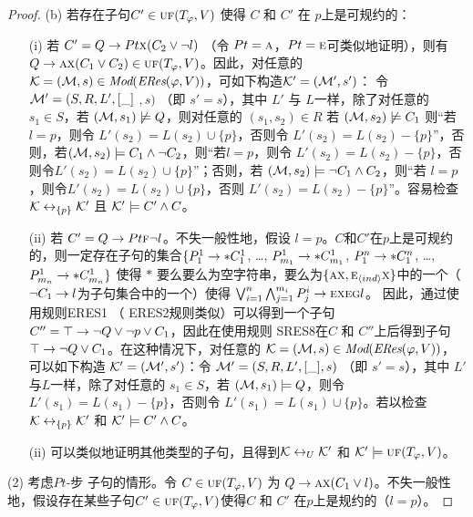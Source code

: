\begin{proof}
	(b) 若存在子句$C'\in \textsc{uf}(T_\varphi,V)$ 使得 $C$ 和 $C'$ 在 $p$上是可规约的：
	\begin{itemize}
		\item[(i)] 若 $C'= Q\rightarrow Pt \textsc{x} (C_2 \vee \neg l)$ （令 $Pt=\textsc{a}$，$Pt = \textsc{e}$可类似地证明），则有$Q\rightarrow \textsc{a} \textsc{x}(C_1 \vee C_2) \in \textsc{uf}(T_\varphi,V)$。因此，对任意的 ${\cal K}=({\cal M}, s)\in \textit{Mod}(\emph{ERes}(\varphi,V))$，可如下构造${\cal K}'=({\cal M}',s')$： 令 ${\cal M}'= (S, R, L',[\_]$ $,s)$ （即 $s'=s$），其中 $L'$ 与 $L$一样，除了对任意的 $s_1\in S$，若 $({\cal M}, s_1) \not \models Q$，则对任意的 $(s_1, s_2) \in R$ 若 $({\cal M}, s_2) \not \models C_1$ 则“若 $l=p$，则令 $L'(s_2) = L(s_2) \cup \{p\}$，否则令 $L'(s_2) = L(s_2) - \{p\}$”，否则，若$({\cal M}, s_2) \models  C_1 \wedge \neg C_2$，则“若$l=p$，则令 $L'(s_2) = L(s_2) - \{p\}$，否则令$L'(s_2) = L(s_2) \cup \{p\}$”；否则，若 $({\cal M}, s_2) \models \neg C_1 \wedge C_2$，则“若 $l=p$，则令$L'(s_2) = L(s_2) \cup \{p\}$，否则 $L'(s_2) = L(s_2) - \{p\}$”。容易检查 ${\cal K} \leftrightarrow_{\{p\}} {\cal K}'$ 且 ${\cal K}' \models C' \wedge C$。
		\item[(ii)] 若 $C' =  Q\rightarrow Pt \textsc{f} \neg l$。不失一般性地，假设 $l=p$。$C$和$C'$在$p$上是可规约的，则一定存在子句的集合$\{P_1^1 \rightarrow * C_1^1$, \dots, $P_{m_1}^1 \rightarrow * C_{m_1}^1$, $P_1^n \rightarrow * C_1^n$, \dots, $P_{m_n}^1 \rightarrow * C_{m_n}^1 \}$ 使得 $*$ 要么要么为空字符串，要么为$\{\textsc{a} \textsc{x}, \textsc{e}_{{\langle{ind}\rangle}} \textsc{x}\}$中的一个（$\neg C_1 \rightarrow l$为子句集合中的一个）使得 $\bigvee_{i=1}^n \bigwedge_{j=1}^{m_i} P_j^i \rightarrow \textsc{e} \textsc{x} \textsc{e} \textsc{g} l$。
		因此，通过使用规则ERES1 （ ERES2规则类似）可以得到一个子句 $C''=\top \rightarrow \neg Q \vee \neg p \vee C_1$，因此在使用规则 SRES8在$C$ 和 $C''$上后得到子句$\top \rightarrow \neg Q \vee C_1$。在这种情况下，对任意的 ${\cal K}=({\cal M}, s)\in \textit{Mod}(\emph{ERes}(\varphi,V))$，可以如下构造 ${\cal K}'=({\cal M}',s')$：令 ${\cal M}'= (S, R, L', [\_],s)$ （即 $s'=s$），其中 $L'$ 与$L$一样，除了对任意的 $s_1\in S$，若 $({\cal M}, s_1) \models Q$，则令 $L'(s_1) = L(s_1) - \{p\}$，否则令 $L'(s_1) = L(s_1) \cup \{p\}$。若以检查 ${\cal K} \leftrightarrow_{\{p\}} {\cal K}'$ 和 ${\cal K}' \models C' \wedge C$。
		\item[(ii)] 可以类似地证明其他类型的子句，且得到${\cal K} \leftrightarrow_{U} {\cal K}'$ 和 ${\cal K}' \models \textsc{uf}(T_\varphi,V)$。
	\end{itemize}
	
	(2) 考虑$Pt$-步 子句的情形。令 $C\in \textsc{uf}(T_\varphi,V)$ 为 $Q \rightarrow \textsc{a} \textsc{x}(C_1 \vee  l)$。不失一般性地，假设存在某些子句$C'\in \textsc{uf}(T_\varphi,V)$使得$C$ 和 $C'$ 在$p$上是规约的（$l=p$）。
	

\end{proof}
